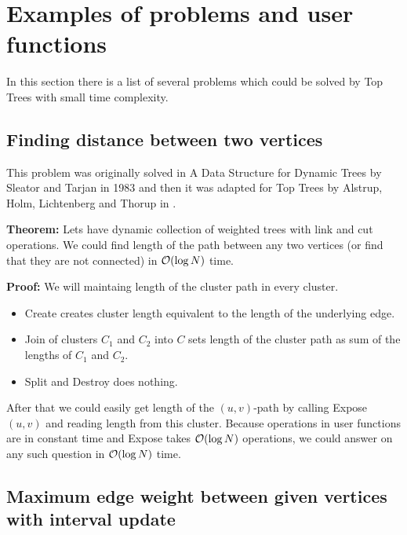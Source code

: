 \chapter{Examples of problems and user functions}
\label{chap:Problems}

In this section there is a list of several problems which could be solved by
Top Trees with small time complexity.

\section{Finding distance between two vertices}

This problem was originally solved in {\I A Data Structure for Dynamic Trees}
\cite{DSforDynamicTrees} by Sleator and Tarjan in 1983 and then it was adapted
for Top Trees by Alstrup, Holm, Lichtenberg and Thorup in \cite{TopTrees}.

{\bf Theorem:} Lets have dynamic collection of weighted trees with link and cut
operations. We could find length of the path between any two vertices (or find
that they are not connected) in ${\cal O}(\log N)$ time.

\medskip\noindent
{\bf Proof:} We will maintaing length of the cluster path in every cluster.

\begin{itemize}

\item {\sc Create} creates cluster length equivalent to the length of the
underlying edge.

\item {\sc Join} of clusters $C_1$ and $C_2$ into $C$ sets length of the cluster
path as sum of the lengths of $C_1$ and $C_2$.

\item {\sc Split} and {\sc Destroy} does nothing.

\end{itemize}

After that we could easily get length of the $(u,v)$-path by calling
{\sc Expose}$(u,v)$ and reading length from this cluster. Because operations
in user functions are in constant time and {\sc Expose} takes ${\cal O}(\log N)$
operations, we could answer on any such question in ${\cal O}(\log N)$ time.


\section{Maximum edge weight between given vertices with interval update}

